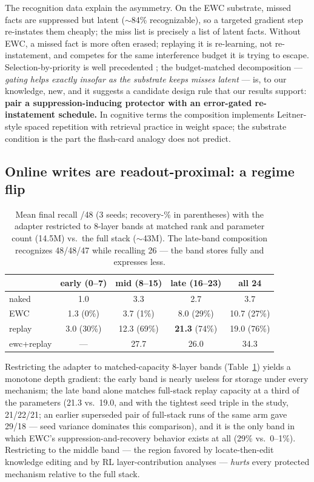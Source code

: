 \documentclass[11pt]{article}
\begin{document}
The recognition data explain the asymmetry. On the EWC substrate, missed facts are suppressed but
latent ($\sim$84\% recognizable), so a targeted gradient step re-instates them cheaply; the miss list
is precisely a list of latent facts. Without EWC, a missed fact is more often erased; replaying it is
re-learning, not re-instatement, and competes for the same interference budget it is trying to escape.
Selection-by-priority is well precedented \citep{schaul2015,aljundi2019mir,sure2025,mssr2026}; the
budget-matched decomposition --- \emph{gating helps exactly insofar as the substrate keeps misses
latent} --- is, to our knowledge, new, and it suggests a candidate design rule that our results support:
\textbf{pair a suppression-inducing protector with an error-gated re-instatement schedule.} In cognitive terms the
composition implements Leitner-style spaced repetition with retrieval practice
\citep{roediger2006} in weight space; the substrate condition is the part the flash-card analogy does
not predict.

\subsection{Online writes are readout-proximal: a regime flip}\label{sec:layers}

\begin{table}[t]
\centering\small
\begin{tabular}{lcccc}
\toprule
& early (0--7) & mid (8--15) & late (16--23) & all 24 \\
\midrule
naked   & 1.0 & 3.3 & 2.7 & 3.7 \\
EWC     & 1.3 \hfill (0\%) & 3.7 \hfill (1\%) & 8.0 \hfill (29\%) & 10.7 \hfill (27\%) \\
replay  & 3.0 \hfill (30\%) & 12.3 \hfill (69\%) & \textbf{21.3} \hfill (74\%) & 19.0 \hfill (76\%) \\
ewc+replay & --- & 27.7 & 26.0 & 34.3 \\
\bottomrule
\end{tabular}
\caption{Mean final recall /48 (3 seeds; recovery-\% in parentheses) with the adapter restricted to
8-layer bands at matched rank and parameter count (14.5M) vs.\ the full stack ($\sim$43M). The
late-band composition recognizes 48/48/47 while recalling 26 --- the band stores fully and expresses
less.}
\label{tab:layers}
\end{table}

Restricting the adapter to matched-capacity 8-layer bands (Table~\ref{tab:layers}) yields a monotone
depth gradient: the early band is nearly useless for storage under every mechanism; the late band
alone matches full-stack replay capacity at a third of the parameters (21.3 vs.\ 19.0, and with
the tightest seed triple in the study, 21/22/21; an earlier superseded pair of full-stack runs of
the same arm gave 29/18 --- seed variance dominates this comparison), and it is the only
band in which EWC's suppression-and-recovery behavior exists at all (29\% vs.\ 0--1\%). Restricting to
the middle band --- the region favored by locate-then-edit knowledge editing
\citep{meng2022rome,meng2023memit} and by RL layer-contribution analyses \citep{onelayer2026} ---
\emph{hurts} every protected mechanism relative to the full stack.
\end{document}
